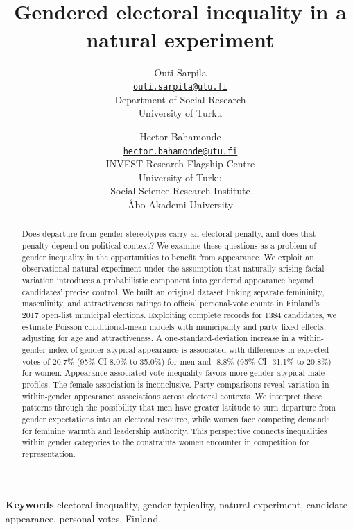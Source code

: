 \documentclass[11pt,a4paper]{article}\usepackage[]{graphicx}\usepackage[]{xcolor}
\title{\vspace{-1.4em}{\bf Atypical looks, unequal votes?}\\
  \large {\bf Gendered electoral inequality in a natural experiment}}
\author{\begin{tabular}[t]{c}
  Outi Sarpila\\[0.2em]
  \small\href{mailto:outi.sarpila@utu.fi}{\texttt{outi.sarpila@utu.fi}}\\[0.5em]
  \small Department of Social Research\\
  \small University of Turku
  \end{tabular}\and
  \begin{tabular}[t]{c}
  Hector Bahamonde\\[0.2em]
  \small\href{mailto:hector.bahamonde@utu.fi}{\texttt{hector.bahamonde@utu.fi}}\\[0.5em]
  \small INVEST Research Flagship Centre\\
  \small University of Turku\\
  \small Social Science Research Institute\\
  \small \AA bo Akademi University
  \end{tabular}}
\date{\CoverDetails}
\begin{document}
\hypersetup{pageanchor=false}
\begin{titlepage}
\maketitle \thispagestyle{empty}
\begingroup
\renewcommand{\thefootnote}{}
\makeatletter
\renewcommand{\@makefntext}[1]{\noindent #1}
\makeatother
{}
\endgroup
\vspace{0.2em}
\begin{abstract}
Does departure from gender stereotypes carry an electoral penalty, and does that penalty depend on political context? We examine these questions as a problem of gender inequality in the opportunities to benefit from appearance. We exploit an observational natural experiment under the assumption that naturally arising facial variation introduces a probabilistic component into gendered appearance beyond candidates' precise control. We built an original dataset linking separate femininity, masculinity, and attractiveness ratings to official personal-vote counts in Finland's 2017 open-list municipal elections. Exploiting complete records for 1384 candidates, we estimate Poisson conditional-mean models with municipality and party fixed effects, adjusting for age and attractiveness. A one-standard-deviation increase in a within-gender index of gender-atypical appearance is associated with differences in expected votes of 20.7\% (95\% CI 8.0\% to 35.0\%) for men and -8.8\% (95\% CI -31.1\% to 20.8\%) for women. Appearance-associated vote inequality favors more gender-atypical male profiles. The female association is inconclusive. Party comparisons reveal variation in within-gender appearance associations across electoral contexts. We interpret these patterns through the possibility that men have greater latitude to turn departure from gender expectations into an electoral resource, while women face competing demands for feminine warmth and leadership authority. This perspective connects inequalities within gender categories to the constraints women encounter in competition for representation.
\end{abstract}
\vspace{0.4em}
\begin{center}
\begin{minipage}{0.9\textwidth}
\small\noindent\textbf{Keywords} electoral inequality, gender typicality, natural experiment, candidate appearance, personal votes, Finland.
\end{minipage}
\end{center}
\end{titlepage}
\hypersetup{pageanchor=true}
\end{document}
